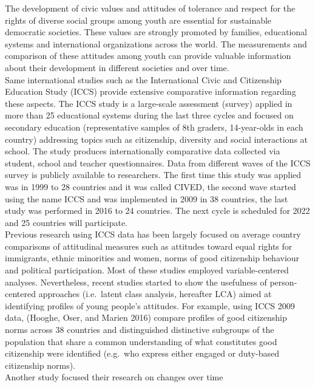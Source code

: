 \documentclass[
      11pt,
                      ]{article}
\begin{document}
The development of civic values and attitudes of tolerance and respect
for the rights of diverse social groups among youth are essential for
sustainable democratic societies. These values are strongly promoted by
families, educational systems and international organizations across the
world. The measurements and comparison of these attitudes among youth
can provide valuable information about their development in different
societies and over time.\\
\newline   Same international studies such as the International Civic
and Citizenship Education Study (ICCS) provide extensive comparative
information regarding these aspects. The ICCS study is a large-scale
assessment (survey) applied in more than 25 educational systems during
the last three cycles and focused on secondary education (representative
samples of 8th graders, 14-year-olds in each country) addressing topics
such as citizenship, diversity and social interactions at school. The
study produces internationally comparative data collected via student,
school and teacher questionnaires. Data from different waves of the ICCS
survey is publicly available to researchers. The first time this study
was applied was in 1999 to 28 countries and it was called CIVED, the
second wave started using the name ICCS and was implemented in 2009 in
38 countries, the last study was performed in 2016 to 24 countries. The
next cycle is scheduled for 2022 and 25 countries will participate.\\
\newline  Previous research using ICCS data has been largely focused on
average country comparisons of attitudinal measures such as attitudes
toward equal rights for immigrants, ethnic minorities and women, norms
of good citizenship behaviour and political participation. Most of these
studies employed variable-centered analyses. Nevertheless, recent
studies started to show the usefulness of person-centered approaches
(i.e.~latent class analysis, hereafter LCA) aimed at identifying
profiles of young people's attitudes. For example, using ICCS 2009 data,
(Hooghe, Oser, and Marien 2016) compare profiles of good citizenship
norms across 38 countries and distinguished distinctive subgroups of the
population that share a common understanding of what constitutes good
citizenship were identified (e.g.~who express either engaged or
duty-based citizenship norms).\\
\newline  Another study focused their research on changes over time
\end{document}
